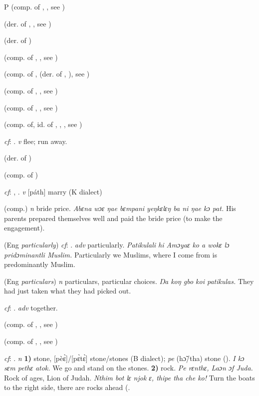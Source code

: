 \begin{letter}{P}
 (comp. of , , see ) 

 (der. of , , see ) 

 (der. of ) 

 (comp. of , , see ) 

 (comp. of ,  (der. of , ), see ) 

 (comp. of , , see ) 

 (comp. of , , see ) 

 (comp. of, id. of , , , see ) 

 \textit{cf}: . \textit{v} flee; run away.

 (der. of ) 

 (comp. of ) 

 \textit{cf}: , . \textit{v} [páth] marry (K dialect)

 (comp.) \textit{n} bride price. \textit{Abɛna wɔɛ ŋae bɛmpani yeŋkɛlɛŋ ba ni ŋae kɔ pat.} His parents prepared themselves well and paid the bride price (to make the engagement). 

 (Eng \textit{particularly}) \textit{cf}: . \textit{adv} particularly. \textit{Patikulali hi Amɔyaɛ ko a wokɛ lɔ pridɔminantli Muslim.} Particularly we Muslims, where I come from is predominantly Muslim.

 (Eng \textit{particulars}) \textit{n} particulars, particular choices. \textit{Ŋa koŋ gbo koi patikulas.} They had just taken what they had picked out.

 \textit{cf}: . \textit{adv} together.

 (comp. of , , see ) 

 (comp. of , , see ) 

 \textit{cf}: . \textit{n} \textbf{1)} stone, [pèɛ̀]/[pɛ̀tɛ̀] stone/stones (B dialect); \textit{pe} (hɔ̃/tha) stone (\citealt{Pichl1967}). \textit{I kɔ sɛm pethɛ atok.} We go and stand on the stones. \textbf{2)} rock. \textit{Pe rɛnthɛ, Laɔn ɔf Juda.} Rock of ages, Lion of Judah. \textit{Nthim bot lɛ njok ɛ, thipe tha che ko!} Turn the boats to the right side, there are rocks ahead (\citealt{Pichl1967}.


\end{letter}
